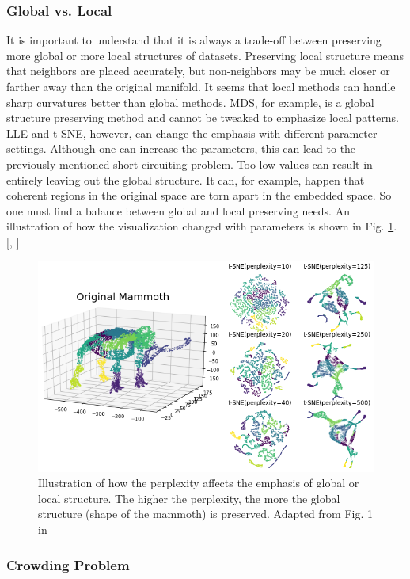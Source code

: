 \subsubsection{Global vs. Local}

It is important to understand that it is always a trade-off between preserving more global or more local structures of datasets. Preserving local structure means that neighbors are placed accurately, but non-neighbors may be much closer or farther away than the original manifold. It seems that local methods can handle sharp curvatures better than global methods. MDS, for example, is a global structure preserving method and cannot be tweaked to emphasize local patterns. LLE and t-SNE, however, can change the emphasis with different parameter settings. Although one can increase the parameters, this can lead to the previously mentioned short-circuiting problem. Too low values can result in entirely leaving out the global structure. It can, for example, happen that coherent regions in the original space are torn apart in the embedded space. So one must find a balance between global and local preserving needs. An illustration of how the visualization changed with parameters is shown in Fig. \ref{fig:mammoth}. [\cite{Cayton05}, \cite{mammoth}]
\begin{figure}[!]
	\centering
	\includegraphics[width=1\columnwidth]{images/mammoth.jpg}
	\caption[Global vs. Local Structures]{Illustration of how the perplexity affects the emphasis of global or local structure. The higher the perplexity, the more the global structure (shape of the mammoth) is preserved. Adapted from Fig. 1 in \cite{mammoth}}
    \label{fig:mammoth}
\end{figure}

\subsubsection{Crowding Problem} \label{subsubsec:crowding}

